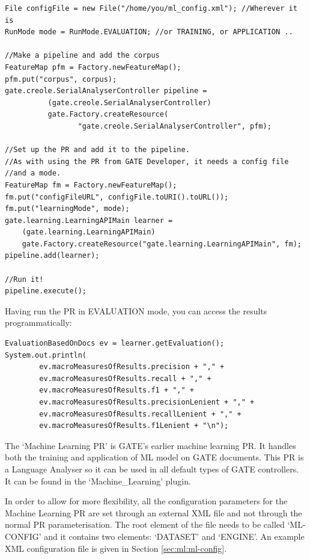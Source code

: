 \begin{small}
\begin{lstlisting}
File configFile = new File("/home/you/ml_config.xml"); //Wherever it is
RunMode mode = RunMode.EVALUATION; //or TRAINING, or APPLICATION ..
		
//Make a pipeline and add the corpus
FeatureMap pfm = Factory.newFeatureMap();
pfm.put("corpus", corpus);
gate.creole.SerialAnalyserController pipeline = 
          (gate.creole.SerialAnalyserController)
          gate.Factory.createResource(
                 "gate.creole.SerialAnalyserController", pfm);

//Set up the PR and add it to the pipeline.
//As with using the PR from GATE Developer, it needs a config file
//and a mode.
FeatureMap fm = Factory.newFeatureMap();
fm.put("configFileURL", configFile.toURI().toURL());
fm.put("learningMode", mode);
gate.learning.LearningAPIMain learner = 
	(gate.learning.LearningAPIMain)
	gate.Factory.createResource("gate.learning.LearningAPIMain", fm);
pipeline.add(learner);

//Run it!
pipeline.execute();
\end{lstlisting}
\end{small}

Having run the PR in EVALUATION mode, you can access the results
programmatically:

\begin{lstlisting}
EvaluationBasedOnDocs ev = learner.getEvaluation();
System.out.println(
		ev.macroMeasuresOfResults.precision + "," + 
		ev.macroMeasuresOfResults.recall + "," + 
		ev.macroMeasuresOfResults.f1 + "," + 
		ev.macroMeasuresOfResults.precisionLenient + "," + 
		ev.macroMeasuresOfResults.recallLenient + "," + 
		ev.macroMeasuresOfResults.f1Lenient + "\n");
\end{lstlisting}


The `Machine Learning PR' is GATE's earlier machine learning PR. It
handles both the training and application of ML model on GATE
documents. This PR is a Language Analyser so it can be used in all
default types of GATE controllers. It can be found in the `Machine\_Learning'
plugin.

In order to allow for more flexibility, all the configuration
parameters for the Machine Learning PR are set through an external XML
file and not through the normal PR parameterisation. The root element
of the file needs to be called `ML-CONFIG' and it contains two
elements: `DATASET' and `ENGINE'. An example XML configuration file is
given in Section
\ref{sec:ml:ml-config}.

